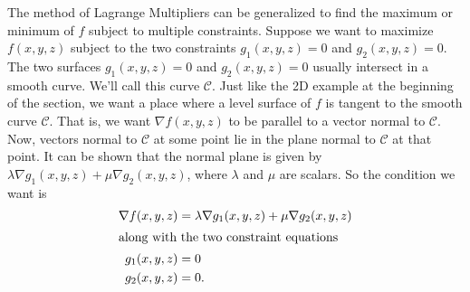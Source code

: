 The method of Lagrange Multipliers can be generalized to find the maximum or minimum of $f$ subject to multiple constraints.  Suppose we want to maximize $f(x,y,z)$ subject to the two constraints $g_1(x,y,z) = 0$ and $g_2(x,y,z) = 0.$  The two surfaces $g_1(x,y,z) = 0$ and $g_2(x,y,z) = 0$ usually intersect in a smooth curve.  We'll call this curve $\mathcal{C}$. Just like the 2D example at the beginning of the section, we want a place where a level surface of $f$ is tangent to the smooth curve $\mathcal{C}$. That is, we want $\nabla f(x,y,z)$ to be parallel to a vector normal to $\mathcal{C}$.  Now, vectors normal to $\mathcal{C}$ at some point lie in the plane normal to $\mathcal{C}$ at that point.  It can be shown that the normal plane is given by $\lambda \nabla g_1(x,y,z) + \mu \nabla g_2(x,y,z)$, where $\lambda$ and $\mu$ are scalars.  So the condition we want is 
	\begin{align*}
		\nabla f(x,y,z) & = \lambda \nabla g_1(x,y,z) + \mu \nabla g_2(x,y,z) \\ \intertext{along with the two constraint equations}
		g_1(x,y,z)      & =0                                                  \\
		g_2(x,y,z)      & =0.
	\end{align*}

